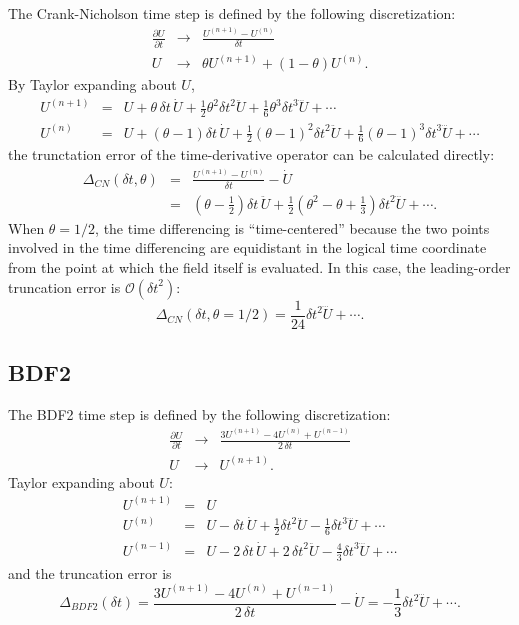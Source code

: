 \documentclass[draft]{book}
\newcommand{\dt}{\ensuremath{\delta t}}
\newcommand{\thimp}{\ensuremath{\theta}}
\newcommand{\order}[1]{\ensuremath{\mathcal{O}(#1)}}
\begin{document}
The Crank-Nicholson time step is defined by the following discretization:
\begin{eqnarray*}
  \frac{\partial U}{\partial t} & \to & 
  \frac{U^{(n+1)} - U^{(n)}}{\dt}\\
  U & \to & \thimp U^{(n+1)} + (1-\thimp) U^{(n)}.
\end{eqnarray*}
By Taylor expanding about $U$,
\begin{eqnarray*}
  U^{(n+1)} & = & U + \thimp\,\dt\,\dot{U} + \frac{1}{2} \thimp^2 \dt^2
  \ddot{U} + \frac{1}{6} \thimp^3 \dt^3 \dddot{U}+ \cdots
  \\
  U^{(n)} & = & U + (\thimp-1) \dt\, \dot{U} + \frac{1}{2} (\thimp-1)^2 \dt^2
  \ddot{U} + \frac{1}{6} (\thimp-1)^3 \dt^3 \dddot{U} + \cdots
\end{eqnarray*}
the trunctation error of the time-derivative operator can be
calculated directly:
\begin{eqnarray*}
  \Delta_{CN}(\dt, \thimp) & = & \frac{U^{(n+1)} - U^{(n)}}{\dt} -
 \dot{U}
 \\ 
 & = & 
  \left( \thimp-\frac{1}{2} \right) \dt\,\ddot{U}
  + \frac{1}{2} \left(\thimp^2 - \thimp + \frac{1}{3} \right) \dt^2 \dddot{U}
  + \cdots.
\end{eqnarray*}
When $\thimp=1/2$, the time differencing is ``time-centered'' because
the two points involved in the time differencing are equidistant in
the logical time coordinate from the point at which the field itself
is evaluated.  In this case, the leading-order truncation error is
$\order{\dt^2}$:
\begin{equation}
  \Delta_{CN}(\dt, \thimp=1/2) = \frac{1}{24} \dt^2 \dddot{U} + \cdots.
\end{equation}

\subsection{BDF2}

The BDF2 time step is defined by the following discretization:
\begin{eqnarray*}
  \frac{\partial U}{\partial t} & \to & 
  \frac{3 U^{(n+1)} - 4 U^{(n)} + U^{(n-1)}}{2\,\dt}\\
  U & \to & U^{(n+1)}.
\end{eqnarray*}
Taylor expanding about $U$:
\begin{eqnarray*}
  U^{(n+1)} & = & U
  \\
  U^{(n)} & = & U - \dt\, \dot{U} + \frac{1}{2} \dt^2 \ddot{U} 
  - \frac{1}{6} \dt^3 \dddot{U} + \cdots
  \\
  U^{(n-1)} & = & U - 2\,\dt\, \dot{U} + 2\,\dt^2 \ddot{U} 
  - \frac{4}{3} \dt^3 \dddot{U} + \cdots
\end{eqnarray*}
and the truncation error is
\begin{equation}
  \Delta_{BDF2}(\dt) = 
  \frac{3 U^{(n+1)} - 4 U^{(n)} + U^{(n-1)}}{2\,\dt} - \dot{U} = 
  - \frac{1}{3} \dt^2 \dddot{U}
  + \cdots.
\end{equation}
\end{document}
